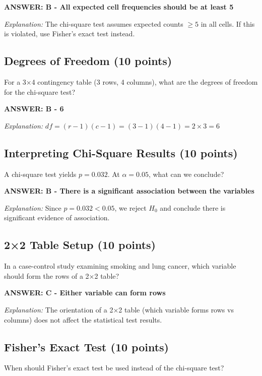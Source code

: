 \documentclass[11pt]{article}
\begin{document}
\textbf{ANSWER: B - All expected cell frequencies should be at least 5}

\textit{Explanation:} The chi-square test assumes expected counts $\geq 5$ in all cells. If this is violated, use Fisher's exact test instead.

\vspace{0.5cm}

\subsection*{Degrees of Freedom (10 points)}
For a 3×4 contingency table (3 rows, 4 columns), what are the degrees of freedom for the chi-square test?

\textbf{ANSWER: B - 6}

\textit{Explanation:} $df = (r-1)(c-1) = (3-1)(4-1) = 2 \times 3 = 6$

\vspace{0.5cm}

\subsection*{Interpreting Chi-Square Results (10 points)}
A chi-square test yields $p = 0.032$. At $\alpha = 0.05$, what can we conclude?

\textbf{ANSWER: B - There is a significant association between the variables}

\textit{Explanation:} Since $p = 0.032 < 0.05$, we reject $H_0$ and conclude there is significant evidence of association.

\vspace{0.5cm}

\subsection*{2×2 Table Setup (10 points)}
In a case-control study examining smoking and lung cancer, which variable should form the rows of a 2×2 table?

\textbf{ANSWER: C - Either variable can form rows}

\textit{Explanation:} The orientation of a 2×2 table (which variable forms rows vs columns) does not affect the statistical test results.

\vspace{0.5cm}

\subsection*{Fisher's Exact Test (10 points)}
When should Fisher's exact test be used instead of the chi-square test?
\end{document}

